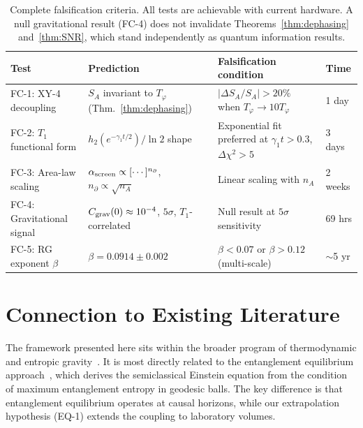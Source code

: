 \documentclass[12pt]{article}
\begin{document}
\begin{table}[ht]
\centering
\caption{Complete falsification criteria. All tests are achievable with current hardware.
A null gravitational result (FC-4) does not invalidate Theorems~\ref{thm:dephasing}
and~\ref{thm:SNR}, which stand independently as quantum information results.}
\label{tab:falsification}
\begin{tabular}{p{1.4cm}p{3.8cm}p{4.2cm}p{1.5cm}}
\toprule
\textbf{Test} & \textbf{Prediction} & \textbf{Falsification condition} & \textbf{Time}\\
\midrule
FC-1: XY-4 decoupling
& $S_A$ invariant to $T_\varphi$ (Thm.~\ref{thm:dephasing})
& $|\Delta S_A/S_A|>20\%$ when $T_\varphi\to 10T_\varphi$
& 1 day\\[6pt]
FC-2: $T_1$ functional form
& $h_2(e^{-\gamma_1 t/2})/\ln 2$ shape
& Exponential fit preferred at $\gamma_1 t>0.3$, $\Delta\chi^2>5$
& 3 days\\[6pt]
FC-3: Area-law scaling
& $\alpha_{\rm screen}\propto[\cdots]^{n_\partial}$, $n_\partial\propto\sqrt{n_A}$
& Linear scaling with $n_A$
& 2 weeks\\[6pt]
FC-4: Gravitational signal
& $C_{\rm grav}(0)\approx 10^{-4}$, $5\sigma$, $T_1$-correlated
& Null result at $5\sigma$ sensitivity
& 69 hrs\\[6pt]
FC-5: RG exponent $\beta$
& $\beta = 0.0914\pm 0.002$
& $\beta<0.07$ or $\beta>0.12$ (multi-scale)
& $\sim$5 yr\\
\bottomrule
\end{tabular}
\end{table}

\section{Connection to Existing Literature}
\label{sec:literature}

The framework presented here sits within the broader program of thermodynamic and
entropic gravity~\cite{Jacobson1995,Verlinde2011,Padmanabhan2010}. It is most directly
related to the entanglement equilibrium approach~\cite{Jacobson2016,Faulkner2014},
which derives the semiclassical Einstein equation from the condition of maximum
entanglement entropy in geodesic balls. The key difference is that entanglement
equilibrium operates at causal horizons, while our extrapolation hypothesis (EQ-1)
extends the coupling to laboratory volumes.
\end{document}
